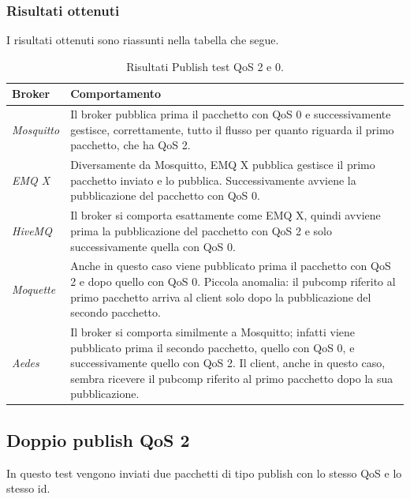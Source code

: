 \documentclass[binding=0.6cm,TFA]{sapthesis}
\begin{document}
\begin{large}
\subsubsection{Risultati ottenuti}
I risultati ottenuti sono riassunti nella tabella che segue.
\begin{table}[h]
\caption{Risultati Publish test QoS 2 e 0.}
\label{tab:resultsqos2and0}
\begin{tabular}{lp{}}
\toprule
\textbf{Broker} & \textbf{Comportamento} \\
\midrule
\textit{Mosquitto} & Il broker pubblica prima il pacchetto con QoS 0 e successivamente gestisce, correttamente, tutto il flusso per quanto riguarda il primo pacchetto, che ha QoS 2. \\
\textit{EMQ X} & Diversamente da Mosquitto, EMQ X pubblica gestisce il primo pacchetto inviato e lo pubblica. Successivamente avviene la pubblicazione del pacchetto con QoS 0. \\
\textit{HiveMQ} & Il broker si comporta esattamente come EMQ X, quindi avviene prima la pubblicazione del pacchetto con QoS 2 e solo successivamente quella con QoS 0. \\
\textit{Moquette} & Anche in questo caso viene pubblicato prima il pacchetto con QoS 2 e dopo quello con QoS 0. Piccola anomalia: il pubcomp riferito al primo pacchetto arriva al client solo dopo la pubblicazione del secondo pacchetto.\\
\textit{Aedes} & Il broker si comporta similmente a Mosquitto; infatti viene pubblicato prima il secondo pacchetto, quello con QoS 0, e successivamente quello con QoS 2. Il client, anche in questo caso, sembra ricevere il pubcomp riferito al primo pacchetto dopo la sua pubblicazione. \\
\bottomrule
\end{tabular}
\end{table}

\newpage
\subsection{Doppio publish QoS 2}
In questo test vengono inviati due pacchetti di tipo publish con lo stesso QoS e lo stesso id.
\begin{python}
\end{python}


\end{large}
\end{document}
